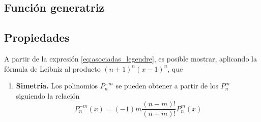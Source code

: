 \subsection{Función generatriz}

\subsection{Propiedades}

A partir de la expresión \eqref{eq:asociadas_legendre}, es posible mostrar, aplicando la fórmula de Leibniz al producto $(n+1)^n (x-1)^n$, que
\begin{enumerate}[series=asociadas]
    \item \textbf{Simetría.} Los polinomios $P^{-m}_n$ se pueden obtener a partir de los $P^{m}_n$ siguiendo la relación
    \begin{equation}
        P^{-m}_n(x) = (-1)m \frac{(n-m)!}{(n+m)!}P^{m}_n(x)
    \end{equation}
\end{enumerate}

